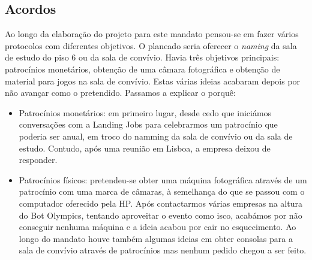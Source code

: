 
\subsection{Acordos}

Ao longo da elaboração do projeto para este mandato pensou-se em fazer vários protocolos com diferentes objetivos. O planeado seria oferecer o \textit{naming} da sala de estudo do piso 6 ou da sala de convívio. Havia três objetivos principais: patrocínios monetários, obtenção de uma câmara fotográfica e obtenção de material para jogos na sala de convívio. Estas várias ideias acabaram depois por não avançar como o pretendido. Passamos a explicar o porquê:
\begin{itemize}
\item Patrocínios monetários: em primeiro lugar, desde cedo que iniciámos conversações com a Landing Jobs para celebrarmos um patrocínio que poderia ser anual, em troco do namming da sala de convívio ou da sala de estudo. Contudo, após uma reunião em Lisboa, a empresa deixou de responder.
\item Patrocínios físicos: pretendeu-se obter uma máquina fotográfica através de um patrocínio com uma marca de câmaras, à semelhança do que se passou com o computador oferecido pela HP. Após contactarmos várias empresas na altura do Bot Olympics, tentando aproveitar o evento como isco, acabámos por não conseguir nenhuma máquina e a ideia acabou por cair no esquecimento. Ao longo do mandato houve também algumas ideias em obter consolas para a sala de convívio através de patrocínios mas nenhum pedido chegou a ser feito.
\end{itemize}